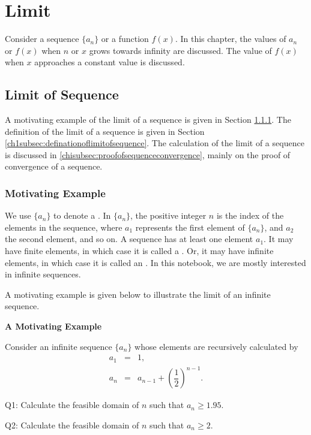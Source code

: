 \chapter{Limit} \label{ch1title}

Consider a sequence $\{a_n\}$ or a function $f(x)$. In this chapter, the values of $a_n$ or $f(x)$ when $n$ or $x$ grows towards infinity are discussed. The value of $f(x)$ when $x$ approaches a constant value is discussed.

\section{Limit of Sequence} \label{ch1sec:limitofsequence}

A motivating example of the limit of a sequence is given in Section \ref{ch1subsec:sequencemotivatingexample}. The definition of the limit of a sequence is given in Section \ref{ch1subsec:definationoflimitofsequence}. The calculation of the limit of a sequence is discussed in \ref{chisubsec:proofofsequenceconvergence}, mainly on the proof of convergence of a sequence.

\subsection{Motivating Example} \label{ch1subsec:sequencemotivatingexample}

We use $\{a_n\}$ to denote a . In $\{a_n\}$, the positive integer $n$ is the index of the elements in the sequence, where $a_1$ represents the first element of $\{a_n\}$, and $a_2$ the second element, and so on. A sequence has at least one element $a_1$. It may have finite elements, in which case it is called a . Or, it may have infinite elements, in which case it is called an . In this notebook, we are mostly interested in infinite sequences.

A motivating example is given below to illustrate the limit of an infinite sequence.

\begin{mdframed}
\noindent \textbf{A Motivating Example}

Consider an infinite sequence $\{a_n\}$ whose elements are recursively calculated by
\begin{eqnarray}
  a_1 &=& 1, \label{ch1eq:motivatingexampleinitialcondition} \\
  a_n &=& a_{n-1} + \left(\dfrac{1}{2}\right)^{n-1}. \label{ch1eq:motivatingexamplerecursive}
\end{eqnarray}

Q1: Calculate the feasible domain of $n$ such that $a_n\geq 1.95$.

Q2: Calculate the feasible domain of $n$ such that $a_n\geq 2$.
\end{mdframed}

